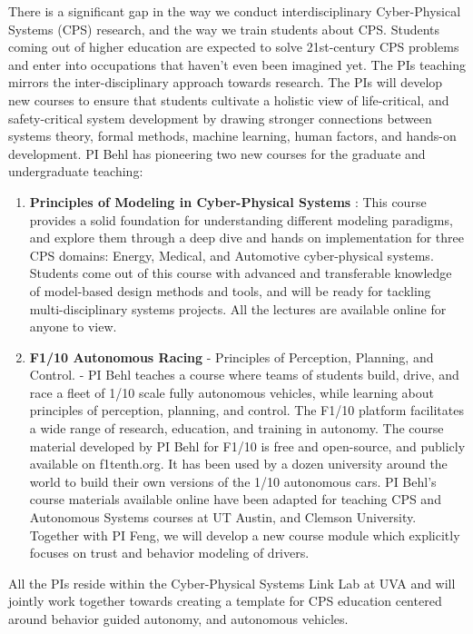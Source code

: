 There is a significant gap in the way we conduct interdisciplinary Cyber-Physical Systems (CPS) research, and the way we train students about CPS. Students coming out of higher education are expected to solve 21st-century CPS problems and enter into occupations that haven’t even been imagined yet. The PIs teaching mirrors the inter-disciplinary approach towards research. 
The PIs will develop new courses to ensure that students cultivate a holistic view of life-critical, and safety-critical system development by drawing stronger connections between systems theory, formal methods, machine learning, human factors, and hands-on development.
PI Behl has pioneering two new courses for the graduate and undergraduate teaching:
\begin{enumerate}[itemsep=0pt,parsep=0pt,topsep=4pt,leftmargin=0.4in]
    \item \textbf{Principles of Modeling in Cyber-Physical Systems} : This course provides a solid foundation for understanding different modeling paradigms, and explore them through a deep dive and hands on implementation for three CPS domains: Energy, Medical, and Automotive cyber-physical systems. Students come out of this course with advanced and transferable knowledge of model-based design methods and tools, and will be ready for tackling multi-disciplinary systems projects. All the lectures are available online for anyone to view. 
    \item \textbf{F1/10 Autonomous Racing} - Principles of Perception, Planning, and Control. - PI Behl teaches a course where teams of students build, drive, and race a fleet of 1/10 scale fully autonomous vehicles, while learning about principles of perception, planning, and control. The F1/10 platform facilitates a wide range of research, education, and training in autonomy. The course material developed by PI Behl for F1/10 is free and open-source, and publicly available on f1tenth.org. It has been used by a dozen university around the world to build their own versions of the 1/10 autonomous cars. PI Behl's course materials available online have been adapted for teaching CPS and Autonomous Systems courses at UT Austin, and Clemson University. Together with PI Feng, we will develop a new course module which explicitly focuses on trust and behavior modeling of drivers. 
\end{enumerate}

All the PIs reside within the Cyber-Physical Systems Link Lab at UVA and will jointly work together towards creating a template for CPS education centered around behavior guided autonomy, and autonomous vehicles. 

